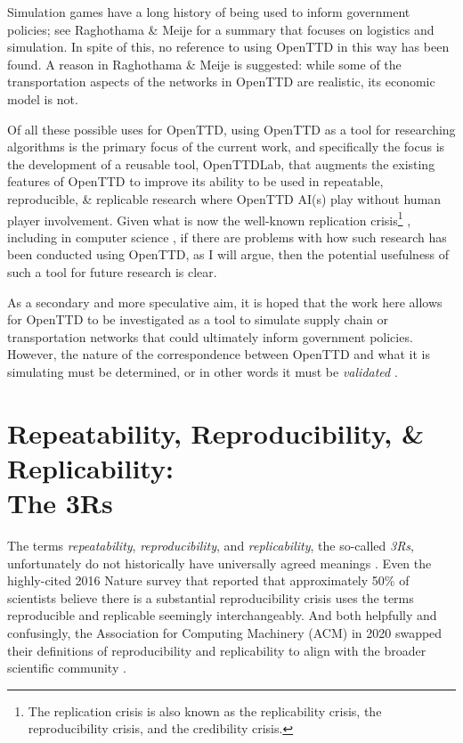 \documentclass[logo,msc,dsti]{style/infthesis}    %
\newcommand{\singlespacedfootnote}[1]{{\singlespace\footnote{#1}}}
\begin{document}
Simulation games have a long history of being used to inform government policies; see Raghothama \& Meije \cite{raghothama2013review} for a summary that focuses on logistics and simulation. In spite of this, no reference to using OpenTTD in this way has been found. A reason in Raghothama \& Meije \cite{raghothama2013review} is suggested: while some of the transportation aspects of the networks in OpenTTD are realistic, its economic model is not.

Of all these possible uses for OpenTTD, using OpenTTD as a tool for researching algorithms is the primary focus of the current work, and specifically the focus is the development of a reusable tool, OpenTTDLab, that augments the existing features of OpenTTD to improve its ability to be used in repeatable, reproducible, \& replicable research where OpenTTD AI(s) play without human player involvement. Given what is now the well-known replication crisis\singlespacedfootnote{The replication crisis is also known as the replicability crisis, the reproducibility crisis, and the credibility crisis.} \cite{ioannidis2005most, baker20161}, including in computer science \cite{dalle2012reproducibility, CollbergChristianProebsting2016}, if there are problems with how such research has been conducted using OpenTTD, as I will argue, then the potential usefulness of such a tool for future research is clear.

As a secondary and more speculative aim, it is hoped that the work here allows for OpenTTD to be investigated as a tool to simulate supply chain or transportation networks that could ultimately inform government policies. However, the nature of the correspondence between OpenTTD and what it is simulating must be determined, or in other words it must be \emph{validated} \cite{doi:10.1177/1046878198291003}.

\section[Repeatability, Reproducibility, \& Replicability: The 3Rs]{Repeatability, Reproducibility, \& Replicability:\texorpdfstring{\\}{ }The 3Rs}
\label{section:define-3rs}

The terms \emph{repeatability}, \emph{reproducibility}, and \emph{replicability}, the so-called \emph{3Rs}, unfortunately do not historically have universally agreed meanings \cite{plesser_reproducibility_2018}. Even the highly-cited 2016 Nature survey that reported that approximately 50\% of scientists believe there is a substantial reproducibility crisis \cite{baker20161}  uses the terms reproducible and replicable seemingly interchangeably. And both helpfully and confusingly, the Association for Computing Machinery (ACM) in 2020 swapped their definitions of reproducibility and replicability to align with the broader scientific community \cite{association_for_computing_machiner_new_2020}.
\end{document}
